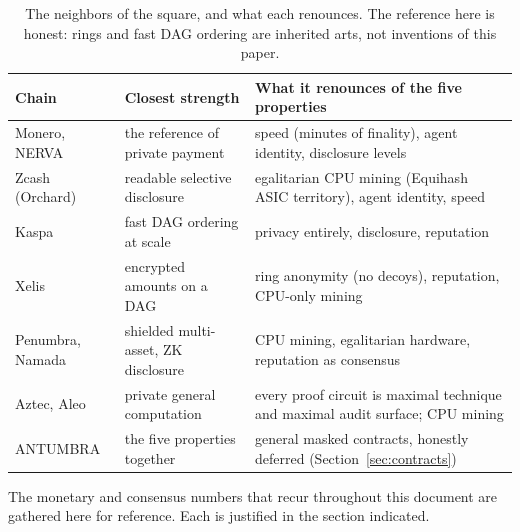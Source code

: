 \begin{table}[htbp]
\centering
\small
\caption{The neighbors of the square, and what each renounces. The
reference here is honest: rings and fast DAG ordering are inherited arts,
not inventions of this paper.}
\label{tab:neighbors}
\begin{tabularx}{\textwidth}{@{}L{2.6cm}L{2.2cm}Y@{}}
\toprule
Chain & Closest strength & What it renounces of the five properties \\
\midrule
Monero, NERVA & the reference of private payment & speed (minutes of finality), agent identity, disclosure levels \\
Zcash (Orchard) & readable selective disclosure & egalitarian CPU mining (Equihash ASIC territory), agent identity, speed \\
Kaspa & fast DAG ordering at scale & privacy entirely, disclosure, reputation \\
Xelis & encrypted amounts on a DAG & ring anonymity (no decoys), reputation, CPU-only mining \\
Penumbra, Namada & shielded multi-asset, ZK disclosure & CPU mining, egalitarian hardware, reputation as consensus \\
Aztec, Aleo & private general computation & every proof circuit is maximal technique and maximal audit surface; CPU mining \\
ANTUMBRA & the five properties together & general masked contracts, honestly deferred (Section~\ref{sec:contracts}) \\
\bottomrule
\end{tabularx}
\end{table}

The monetary and consensus numbers that recur throughout this document are
gathered here for reference. Each is justified in the section indicated.

